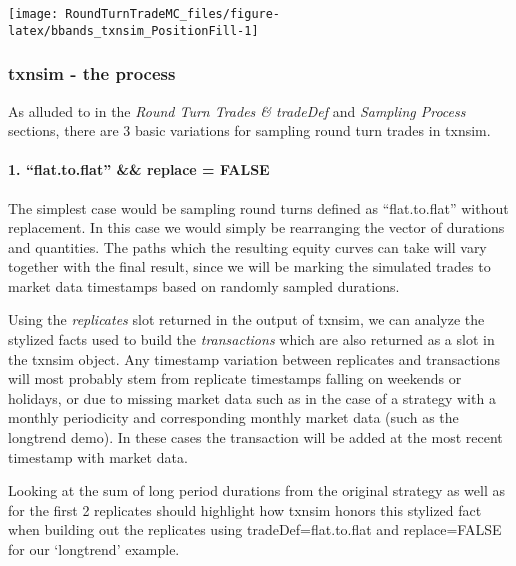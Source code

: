 \begin{Schunk}


\begin{center}\texttt{[image: RoundTurnTradeMC\_files/figure-latex/bbands\_txnsim\_PositionFill-1]} \end{center}

\end{Schunk}

\hypertarget{txnsim---the-process}{%
\subsubsection{txnsim - the process}\label{txnsim---the-process}}

As alluded to in the \emph{Round Turn Trades \& tradeDef} and
\emph{Sampling Process} sections, there are 3 basic variations for
sampling round turn trades in txnsim.

\hypertarget{flat.to.flat-replace-false}{%
\paragraph{1. ``flat.to.flat'' \&\& replace =
FALSE}\label{flat.to.flat-replace-false}}

The simplest case would be sampling round turns defined as
``flat.to.flat'' without replacement. In this case we would simply be
rearranging the vector of durations and quantities. The paths which the
resulting equity curves can take will vary together with the final
result, since we will be marking the simulated trades to market data
timestamps based on randomly sampled durations.

Using the \emph{replicates} slot returned in the output of txnsim, we
can analyze the stylized facts used to build the \emph{transactions}
which are also returned as a slot in the txnsim object. Any timestamp
variation between replicates and transactions will most probably stem
from replicate timestamps falling on weekends or holidays, or due to
missing market data such as in the case of a strategy with a monthly
periodicity and corresponding monthly market data (such as the longtrend
demo). In these cases the transaction will be added at the most recent
timestamp with market data.

Looking at the sum of long period durations from the original strategy
as well as for the first 2 replicates should highlight how txnsim honors
this stylized fact when building out the replicates using
tradeDef=flat.to.flat and replace=FALSE for our `longtrend' example.

